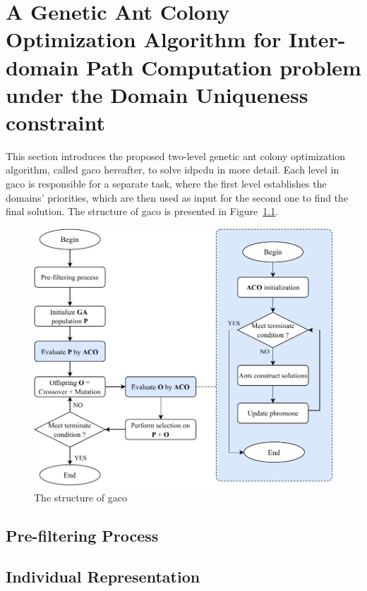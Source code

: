 \chapter{A Genetic Ant Colony Optimization Algorithm for Inter-domain Path Computation problem under the Domain Uniqueness constraint}
\label{chap:chap3}
This section introduces the proposed two-level genetic ant colony optimization algorithm, called \acrshort{gaco} hereafter, to solve \gls{idpcdu} in more detail. Each level in \acrshort{gaco} is responsible for a separate task, where the first level establishes the domains' priorities, which are then used as input for the second one to find the final solution. The structure of \acrshort{gaco} is presented in Figure~\ref{fig:flowchart}.

\setlength{\intextsep}{3pt}
\renewcommand{\scalefigure}{0.85}
\begin{figure}[htbp]
	\centering
	\includegraphics[scale=\scalefigure]{Figures/chap 3/Flowchart.pdf}
	\caption{The structure of \acrshort{gaco}}
	\label{fig:flowchart}
\end{figure}

\section{Pre-filtering Process}
\label{proposed:prefiltering}


\section{Individual Representation}
\label{proposed:encoding}


